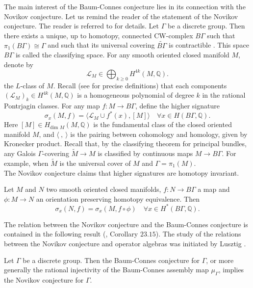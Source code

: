 The main interest of the Baum-Connes conjecture lies in its connection with the Novikov conjecture. Let us remind the reader of the statement of the Novikov conjecture. The reader is referred to \cite{kreckluck} for details. Let $\Gamma$ be a discrete group. Then there exists a unique, up to homotopy, connected CW-complex $B\Gamma$ such that $\pi_1(B \Gamma) \cong \Gamma$ and such that its universal covering $\tilde{B\Gamma}$ is contractible \cite{May}. This space $B\Gamma$ is called the classifying space. For any smooth oriented closed manifold $M$, denote by \[\mathcal L_M \in \bigoplus_{k\geq 0} H^{4k}(M,\mathbb Q).\] the $L$-class of $M$. Recall (see \cite{kreckluck} for precise definitions) that each components $(\mathcal L_M)_k\in H^{4k}(M,\mathbb Q) $ is a homogeneous polynomial of degree $k$ in the rational Pontrjagin classes. For any map $f: M\rightarrow B\Gamma$, define the higher signature 
\[\sigma_x(M,f) = \langle \mathcal L_M \cup f^*(x),[M] \rangle \quad \forall x\in H(B\Gamma,\mathbb Q).\]
Here $[M]\in H_{\text{dim }M}(M,\mathbb Q)$ is the fundamental class of the closed oriented manifold $M$, and $\langle \ , \ \rangle $ is the pairing between cohomology and homology, given by Kronecker product. Recall that, by the classifying theorem for principal bundles, any Galois $\Gamma$-covering $\tilde M \rightarrow M $ is classified by continuous maps $M\rightarrow B\Gamma$. For example, when $\tilde M$ is the universal cover of $M$ and $\Gamma=\pi_1(M)$.\\

The Novikov conjecture claims that higher signatures are homotopy invariant.

\begin{conj}[Novikov]\label{Novikov}
Let $M$ and $N$ two smooth oriented closed manifolds, $f: N\rightarrow B\Gamma$ a map and $\phi : M\rightarrow N$ an orientation preserving homotopy equivalence. Then 
\[\sigma_x(N,f)= \sigma_x(M,f\circ\phi )\quad \forall x\in H^*(B\Gamma,\mathbb Q).\]
\end{conj}

The relation between the Novikov conjecture and the Baum-Connes conjecture is contained in the following result (\cite{kreckluck}, Corollary $23.15$). The study of the relations between the Novikov conjecture and operator algebras was initiated by Lusztig \cite{lusztig}. 

\begin{thm}
Let $\Gamma$ be a discrete group. Then the Baum-Connes conjecture for $\Gamma$, or more generally the rational injectivity of the Baum-Connes assembly map $\mu_\Gamma$, implies the Novikov conjecture for $\Gamma$.
\end{thm}

